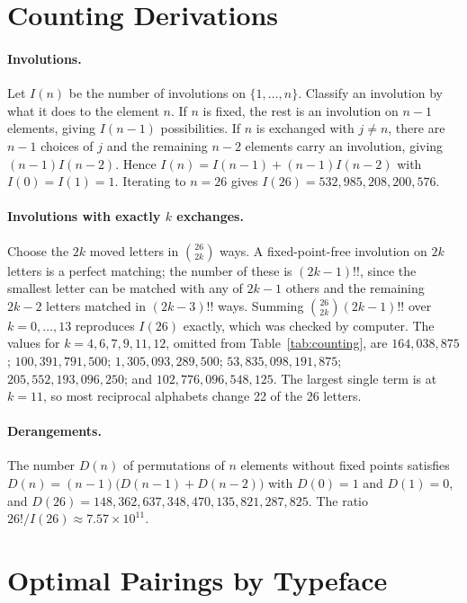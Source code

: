 \section{Counting Derivations}\label{app:counting}

\paragraph{Involutions.}
Let $I(n)$ be the number of involutions on $\{1,\dots,n\}$. Classify an involution by what it does to the element $n$. If $n$ is fixed, the rest is an involution on $n-1$ elements, giving $I(n-1)$ possibilities. If $n$ is exchanged with $j\ne n$, there are $n-1$ choices of $j$ and the remaining $n-2$ elements carry an involution, giving $(n-1)I(n-2)$. Hence $I(n)=I(n-1)+(n-1)I(n-2)$ with $I(0)=I(1)=1$. Iterating to $n=26$ gives $I(26)=532{,}985{,}208{,}200{,}576$.

\paragraph{Involutions with exactly $k$ exchanges.}
Choose the $2k$ moved letters in $\binom{26}{2k}$ ways. A fixed-point-free involution on $2k$ letters is a perfect matching; the number of these is $(2k-1)!!$, since the smallest letter can be matched with any of $2k-1$ others and the remaining $2k-2$ letters matched in $(2k-3)!!$ ways. Summing $\binom{26}{2k}(2k-1)!!$ over $k=0,\dots,13$ reproduces $I(26)$ exactly, which was checked by computer. The values for $k=4,6,7,9,11,12$, omitted from Table~\ref{tab:counting}, are $164{,}038{,}875$; $100{,}391{,}791{,}500$; $1{,}305{,}093{,}289{,}500$; $53{,}835{,}098{,}191{,}875$; $205{,}552{,}193{,}096{,}250$; and $102{,}776{,}096{,}548{,}125$. The largest single term is at $k=11$, so most reciprocal alphabets change 22 of the 26 letters.

\paragraph{Derangements.}
The number $D(n)$ of permutations of $n$ elements without fixed points satisfies $D(n)=(n-1)\bigl(D(n-1)+D(n-2)\bigr)$ with $D(0)=1$ and $D(1)=0$, and $D(26)=148{,}362{,}637{,}348{,}470{,}135{,}821{,}287{,}825$. The ratio $26!/I(26)\approx7.57\times10^{11}$.

\section{Optimal Pairings by Typeface}\label{app:pairings}

